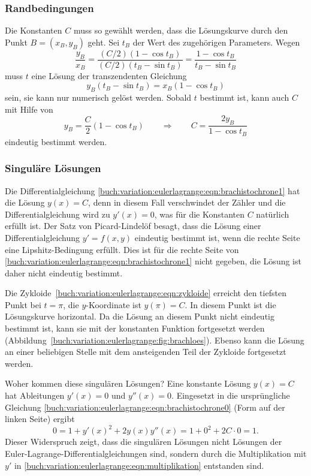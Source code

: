 %
%
\subsubsection{Randbedingungen}
Die Konstanten $C$ muss so gewählt werden, dass die Lösungskurve
durch den Punkt $B=(x_B,y_B)$ geht. 
Sei $t_B$ der Wert des zugehörigen Parameters.
Wegen
\[
\frac{y_B}{x_B}
=
\frac{(C/2)(1-\cos t_B)}{(C/2)(t_B-\sin t_B)}
=
\frac{1-\cos t_B}{t_B-\sin t_B}
\]
muss $t$ eine Lösung der transzendenten Gleichung
\[
y_B(t_B-\sin t_B)=x_B(1-\cos t_B)
\]
sein, sie kann nur numerisch gelöst werden.
Sobald $t$ bestimmt ist, kann auch $C$ mit Hilfe von
\[
y_B = \frac{C}2(1-\cos t_B)
\qquad\Rightarrow\qquad
C
=
\frac{2y_B}{1-\cos t_B}
\]
eindeutig bestimmt werden.

%
%
\subsubsection{Singuläre Lösungen}

Die Differentialgleichung
\eqref{buch:variation:eulerlagrange:eqn:brachistochrone1}
hat die Lösung $y(x)=C$, denn in diesem Fall verschwindet
der Zähler und die Differentialgleichung wird zu $y'(x)=0$,
was für die Konstanten $C$ natürlich erfüllt ist.
Der Satz von Picard-Lindelöf besagt, dass die Lösung einer
Differentialgleichung $y'=f(x,y)$ eindeutig bestimmt ist, wenn die rechte
Seite eine Lipshitz-Bedingung erfüllt.
Dies ist für die rechte Seite von
\eqref{buch:variation:eulerlagrange:eqn:brachistochrone1}
nicht gegeben, die Lösung ist daher nicht eindeutig bestimmt.

Die Zykloide~\eqref{buch:variation:eulerlagrange:eqn:zykloide}
erreicht den tiefsten Punkt bei $t=\pi$, die $y$-Koordinate ist
$y(\pi)=C$.
In diesem Punkt ist die Lösungskurve horizontal.
Da die Lösung an diesem Punkt nicht eindeutig bestimmt ist,
kann sie mit der konstanten Funktion fortgesetzt werden
(Abbildung~\ref{buch:variation:eulerlagrange:fig:brachloes}).
Ebenso kann die Lösung an einer beliebigen Stelle mit dem ansteigenden
Teil der Zykloide fortgesetzt werden.

Woher kommen diese singulären Lösungen?
Eine konstante Lösung $y(x)=C$ hat Ableitungen
$y'(x)=0$ und $y''(x)=0$.
Eingesetzt in die ursprüngliche Gleichung
\eqref{buch:variation:eulerlagrange:eqn:brachistochrone0}
(Form auf der linken Seite) ergibt
\[
0
=
1+y'(x)^2+2y(x)y''(x)
=
1 + 0^2 + 2C\cdot 0
=
1.
\]
Dieser Widerspruch zeigt, dass die singulären Lösungen nicht
Lösungen der Euler-La\-gran\-ge-Differentialgleichungen sind, sondern
durch die Multiplikation mit $y'$ in
\eqref{buch:variation:eulerlagrange:eqn:multiplikation}
entstanden sind.

